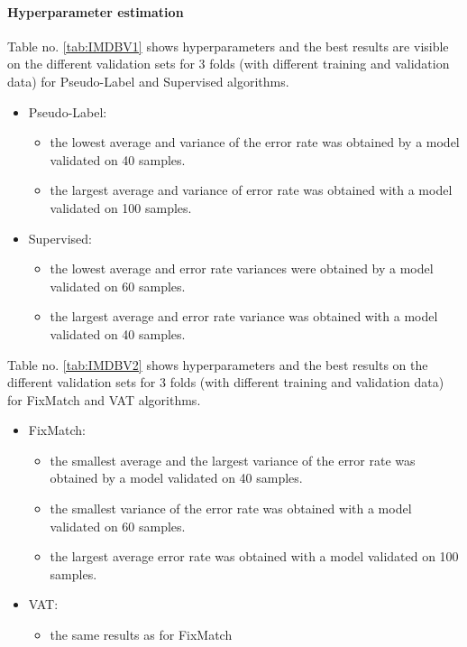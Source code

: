 \documentclass[12pt]{article}
\theoremstyle{definition}
\DeclareRobustCommand{\[}{\begin{equation}}
\DeclareRobustCommand{\]}{\end{equation}}
\begin{document}
\paragraph{Hyperparameter estimation}
\par Table no. \ref{tab:IMDBV1} shows hyperparameters and the best results are visible on the different validation sets for 3 folds (with different training and validation data) for Pseudo-Label and Supervised algorithms.
\begin{itemize}
    \item Pseudo-Label:
    \begin{itemize}
          \item the lowest average and variance of the error rate was obtained by a model validated on 40 samples.
          \item the largest average and variance of error rate was obtained with a model validated on 100 samples.
    \end{itemize}
    \item Supervised:
    \begin{itemize}
        \item the lowest average and error rate variances were obtained by a model validated on 60 samples.
        \item the largest average and error rate variance was obtained with a model validated on 40 samples.
    \end{itemize}
\end{itemize}


\par Table no. \ref{tab:IMDBV2} shows hyperparameters and the best results on the different validation sets for 3 folds (with different training and validation data) for FixMatch and VAT algorithms.
\begin{itemize}
    \item FixMatch:
    \begin{itemize}
        \item the smallest average and the largest variance of the error rate was obtained by a model validated on 40 samples.
        \item the smallest variance of the error rate was obtained with a model validated on 60 samples.
        \item the largest average error rate was obtained with a model validated on 100 samples.
    \end{itemize}
    \item VAT:
    \begin{itemize}
        \item the same results as for FixMatch
    \end{itemize}
\end{itemize}
\vspace{5mm} %
\vspace{5mm} %
\end{document}
